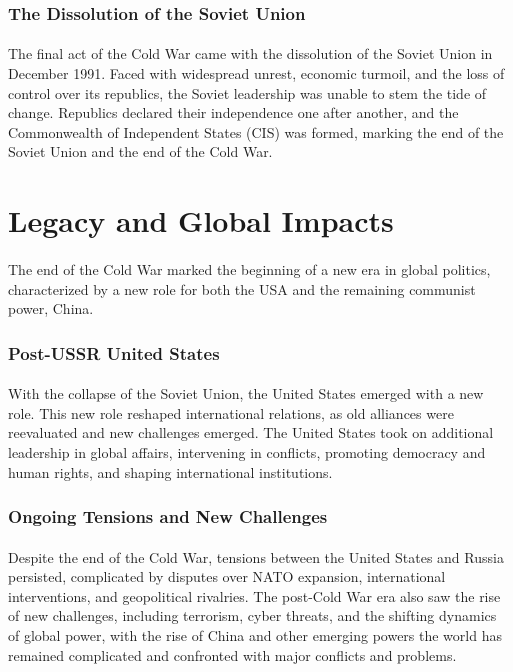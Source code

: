 \documentclass[a4paper,12pt]{book}
\begin{document}
\subsubsection*{The Dissolution of the Soviet Union}
\paragraph{}
The final act of the Cold War came with the dissolution of the Soviet Union in December 1991. Faced with widespread unrest, economic turmoil, and the loss of control over its republics, the Soviet leadership was unable to stem the tide of change. Republics declared their independence one after another, and the Commonwealth of Independent States (CIS) was formed, marking the end of the Soviet Union and the end of the Cold War. 

\section*{Legacy and Global Impacts}
\paragraph{}
The end of the Cold War marked the beginning of a new era in global politics, characterized by a new role for both the USA and the remaining communist power, China. 

\subsubsection*{Post-USSR United States}
\paragraph{}
With the collapse of the Soviet Union, the United States emerged with a new role. This new role reshaped international relations, as old alliances were reevaluated and new challenges emerged. The United States took on additional leadership in global affairs, intervening in conflicts, promoting democracy and human rights, and shaping international institutions. 

\subsubsection*{Ongoing Tensions and New Challenges}
\paragraph{}
Despite the end of the Cold War, tensions between the United States and Russia persisted, complicated by disputes over NATO expansion, international interventions, and geopolitical rivalries. The post-Cold War era also saw the rise of new challenges, including terrorism, cyber threats, and the shifting dynamics of global power, with the rise of China and other emerging powers the world has remained complicated and confronted with major conflicts and problems.
\end{document}
